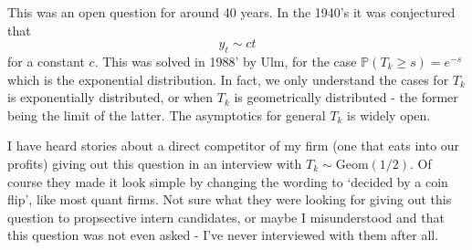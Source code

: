This was an open question for around 40 years. In the 1940's it was conjectured that \[
y_t \sim ct
\]
for a constant $c$. This was solved in 1988' by Ulm, for the case $\mathbb{P}(T_k\geq s) = e^{-s}$ which is the exponential distribution. In fact, we only understand the cases for $T_k$ is exponentially distributed, or when $T_k$ is geometrically distributed - the former being the limit of the latter. The asymptotics for general $T_k$ is widely open.

\begin{remark}
    I have heard stories about a direct competitor of my firm (one that eats into our profits) giving out this question in an interview with $T_k \sim \text{Geom}(1/2)$. Of course they made it look simple by changing the wording to `decided by a coin flip', like most quant firms. Not sure what they were looking for giving out this question to propsective intern candidates, or maybe I misunderstood and that this question was not even asked - I've never interviewed with them after all.
\end{remark}


